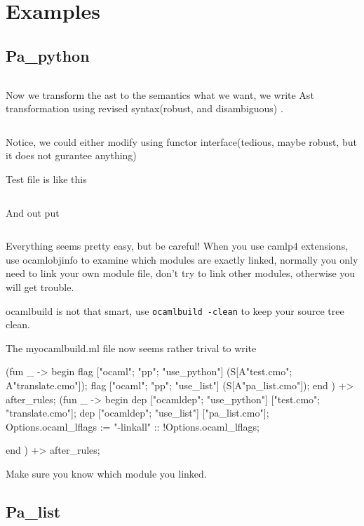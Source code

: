 \section{Examples}
\subsection{Pa\_python}

\inputminted[fontsize=\scriptsize,]{ocaml}{camlp4/code/edsl/test.ml}

Now we transform the ast to the semantics what we want, we write Ast
transformation using revised syntax(robust, and disambiguous) .

\inputminted[fontsize=\scriptsize,]{ocaml}{camlp4/code/edsl/translate.ml}

Notice, we could either modify using functor interface(tedious, maybe
robust, but it does not gurantee anything)

Test file is like this 
\inputminted[fontsize=\scriptsize,]{python}{camlp4/code/edsl/test_py.ml}

And out put
\inputminted[fontsize=\scriptsize,]{python}{camlp4/code/edsl/test_py.ppo.ml}

Everything seems pretty easy, but be careful! When you use camlp4
extensions, use ocamlobjinfo to examine which modules are exactly
linked, normally you only need to link your own module file, don't try
to link other modules, otherwise you will get trouble. 

ocamlbuild is not that smart, use \verb|ocamlbuild -clean| to keep
your source tree clean.

The myocamlbuild.ml file now seems rather trival to write 
\begin{ocamlcode}
  (fun _ -> begin 
    flag ["ocaml"; "pp"; "use_python"]
      (S[A"test.cmo"; A"translate.cmo"]);
    flag ["ocaml"; "pp"; "use_list"]
      (S[A"pa_list.cmo"]);
  end ) +> after_rules;
  (fun _ -> begin
    dep ["ocamldep";  "use_python"] ["test.cmo"; "translate.cmo"];
    dep ["ocamldep";  "use_list"] ["pa_list.cmo"];
    Options.ocaml_lflags := "-linkall" :: !Options.ocaml_lflags;

   end ) +> after_rules;
\end{ocamlcode}
Make sure you know which module you linked.


\subsection{Pa\_list}
\inputminted[fontsize=\scriptsize]{ocaml}{camlp4/examples/pa_list.ml}


